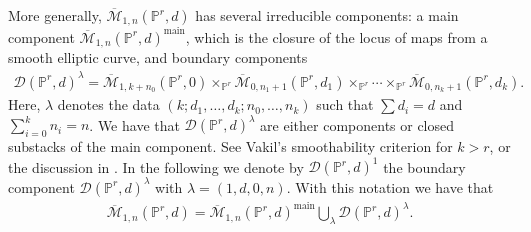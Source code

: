 \documentclass[pdftex]{sigma}
\numberwithin{equation}{section}
\newcommand{\MM}[4]{\overline{\mathcal M}_{#1,#2}(#3,#4)}
\begin{document}
\begin{Example}\label{ex:components} More generally, $\MM{1}{n}{\mathbb P^r}{d}$ has several irreducible components: a main component $\MM{1}{n}{\mathbb P^r}{d}^{\mathrm{main}}$, which is the closure of the locus of maps from a smooth elliptic curve, and boundary components \begin{gather*}\mathcal{D}(\mathbb{P}^r, d)^{\lambda}=\MM{1}{k+n_0}{\mathbb P^r}{0}\times_{\mathbb{P}^r}\MM{0}{n_1+1}{\mathbb P^r}{d_1}\times_{\mathbb{P}^r}\cdots \times_{\mathbb{P}^r} \MM{0}{n_k+1}{\mathbb P^r}{d_k}.\end{gather*} Here, $\lambda$ denotes the data $(k;d_1,\dots,d_k; n_0,\dots,n_k) $ such that $\sum d_i=d$ and $\sum\limits_{i=0}^k n_i=n$. We have that $\mathcal{D}(\mathbb{P}^r, d)^{\lambda}$ are either components or closed substacks of the main component. See Vakil's smoothability criterion \cite[Lemma~5.9]{Vre} for $k>r$, or the discussion in \cite[Section~2]{BCM}. In the following we denote by $\mathcal{D}(\mathbb{P}^r, d)^1$ the boundary component $\mathcal{D}(\mathbb{P}^r, d)^{\lambda}$ with $\lambda=(1,d,0,n)$. With this notation we have that \begin{gather*}\MM{1}{n}{\mathbb P^r}{d}=\MM{1}{n}{\mathbb P^r}{d}^{\mathrm{main}}\bigcup_{\lambda} \mathcal{D}(\mathbb{P}^r, d)^{\lambda}.\end{gather*}
\end{Example}
\end{document}
